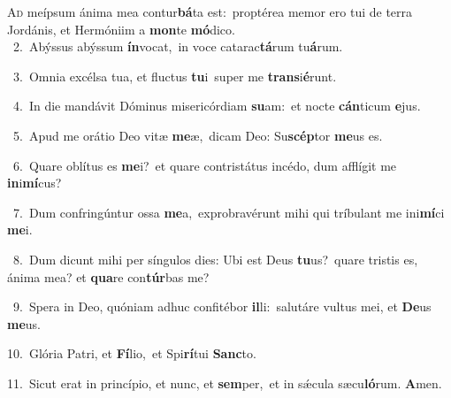 \lettrine{\initial\textcolor{\initialcolor}{A}}{d} meípsum ánima mea contur\-\textbf{bá}\-ta est:~\star proptérea memor ero tui de terra Jordánis, et Hermóniim a \textbf{mon}\-te \textbf{mó}\-dico.\\
{\numbfont\textcolor{\numbcolor}{~2.}}~Abýssus abýssum \textbf{ín}\-vocat,~\star in voce catarac\-\textbf{tá}\-rum tu\-\textbf{á}\-rum.\par
{\numbfont\textcolor{\numbcolor}{~3.}}~Omnia excélsa tua, et fluctus \textbf{tu}\-i~\star super me \textbf{trans}\-i\-\textbf{é}\-runt.\par
{\numbfont\textcolor{\numbcolor}{~4.}}~In die mandávit Dóminus misericórdiam \textbf{su}\-am:~\star et nocte \textbf{cán}\-ticum \textbf{e}\-jus.\par
{\numbfont\textcolor{\numbcolor}{~5.}}~Apud me orátio Deo vitæ \textbf{me}\-æ,~\star dicam Deo: Su\-\textbf{scép}\-tor \textbf{me}\-us es.\par
{\numbfont\textcolor{\numbcolor}{~6.}}~Quare oblítus es \textbf{me}\-i?~\star et quare contristátus incédo, dum afflígit me \textbf{in}\-i\-\textbf{mí}\-cus?\par
{\numbfont\textcolor{\numbcolor}{~7.}}~Dum confringúntur ossa \textbf{me}\-a,~\star exprobravérunt mihi qui tríbulant me ini\-\textbf{mí}\-ci \textbf{me}\-i.\par
{\numbfont\textcolor{\numbcolor}{~8.}}~Dum dicunt mihi per síngulos dies: Ubi est Deus \textbf{tu}\-us?~\star quare tristis es, ánima mea? et \textbf{qua}\-re con\-\textbf{túr}\-bas me?\par
{\numbfont\textcolor{\numbcolor}{~9.}}~Spera in Deo, quóniam adhuc confitébor \textbf{il}\-li:~\star salutáre vultus mei, et \textbf{De}\-us \textbf{me}\-us.\par
{\numbfont\textcolor{\numbcolor}{10.}}~Glória Patri, et \textbf{Fí}\-lio,~\star et Spi\-\textbf{rí}\-tui \textbf{Sanc}\-to.\par
{\numbfont\textcolor{\numbcolor}{11.}}~Sicut erat in princípio, et nunc, et \textbf{sem}\-per,~\star et in sǽcula sæcu\-\textbf{ló}\-rum. \textbf{A}\-men.\par
